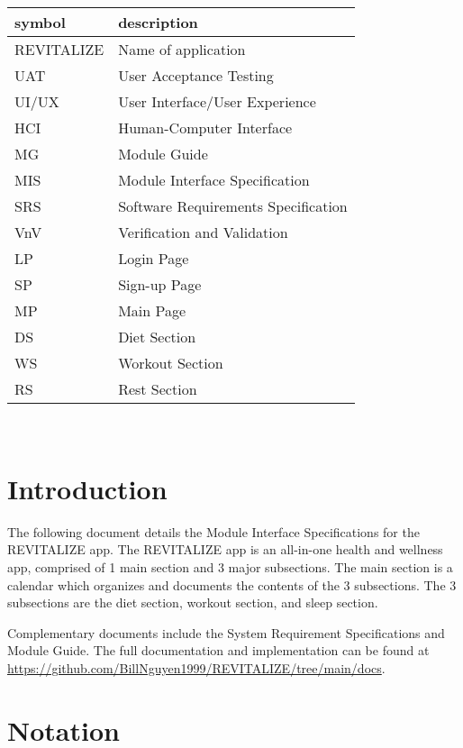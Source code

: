\documentclass[12pt, titlepage]{article}
\begin{document}
\renewcommand{\arraystretch}{1.2}
\begin{tabular}{l l} 
	\toprule		
	\textbf{symbol} & \textbf{description}\\
	\midrule 
	REVITALIZE & Name of application\\
	UAT & User Acceptance Testing\\
	UI/UX & User Interface/User Experience\\
	HCI & Human-Computer Interface\\
	MG & Module Guide\\
	MIS & Module Interface Specification\\
	SRS & Software Requirements Specification\\
	VnV & Verification and Validation\\
	LP & Login Page\\
	SP & Sign-up Page\\
	MP & Main Page\\
	DS & Diet Section\\
	WS & Workout Section\\
	RS & Rest Section\\
	\bottomrule
\end{tabular}\\

\newpage

\tableofcontents

\newpage


\section{Introduction}

The following document details the Module Interface Specifications for
the REVITALIZE app. The REVITALIZE app is an all-in-one health and wellness app, comprised of 1 main 
section and 3 major subsections. The main section is a calendar which organizes and documents the contents of the 3 subsections. 
The 3 subsections are the diet section, workout section, and sleep section.

Complementary documents include the System Requirement Specifications
and Module Guide.  The full documentation and implementation can be
found at \url{https://github.com/BillNguyen1999/REVITALIZE/tree/main/docs}.

\section{Notation}
\end{document}
